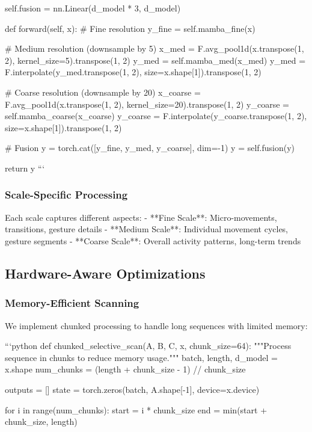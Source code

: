 \documentclass[10pt,journal,compsoc]{IEEEtran}
\begin{document}
        self.fusion = nn.Linear(d_model * 3, d_model)
        
    def forward(self, x):
        # Fine resolution
        y_fine = self.mamba_fine(x)
        
        # Medium resolution (downsample by 5)
        x_med = F.avg_pool1d(x.transpose(1, 2), kernel_size=5).transpose(1, 2)
        y_med = self.mamba_med(x_med)
        y_med = F.interpolate(y_med.transpose(1, 2), size=x.shape[1]).transpose(1, 2)
        
        # Coarse resolution (downsample by 20)
        x_coarse = F.avg_pool1d(x.transpose(1, 2), kernel_size=20).transpose(1, 2)
        y_coarse = self.mamba_coarse(x_coarse)
        y_coarse = F.interpolate(y_coarse.transpose(1, 2), size=x.shape[1]).transpose(1, 2)
        
        # Fusion
        y = torch.cat([y_fine, y_med, y_coarse], dim=-1)
        y = self.fusion(y)
        
        return y
```

\subsubsection{Scale-Specific Processing}

Each scale captures different aspects:
- **Fine Scale**: Micro-movements, transitions, gesture details
- **Medium Scale**: Individual movement cycles, gesture segments
- **Coarse Scale**: Overall activity patterns, long-term trends

\subsection{Hardware-Aware Optimizations}

\subsubsection{Memory-Efficient Scanning}

We implement chunked processing to handle long sequences with limited memory:

```python
def chunked_selective_scan(A, B, C, x, chunk_size=64):
    """Process sequence in chunks to reduce memory usage."""
    batch, length, d_model = x.shape
    num_chunks = (length + chunk_size - 1) // chunk_size
    
    outputs = []
    state = torch.zeros(batch, A.shape[-1], device=x.device)
    
    for i in range(num_chunks):
        start = i * chunk_size
        end = min(start + chunk_size, length)
        
\end{document}
